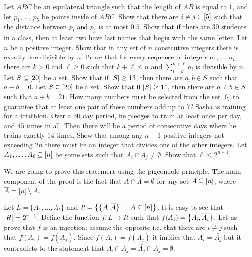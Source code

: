 \begin{chapterendexercises}
  \exercise Let $ABC$ be an equilateral triangle such that the length of $AB$ is
    equal to $1$, and let $p_1$, \dots, $p_5$ be points inside of $ABC$.
    Show that there are $i \neq j \in {[{5}]}$ such that the distance between 
    $p_i$ and $p_j$ is at most $0.5$.
  \exercise Show that if there are 30 students in a class, then at least
    two have last names that begin with the same letter.
  \exercise Let $n$ be a positive integer. Show that in any set of $n$
    consecutive integers there is exactly one divisible by $n$.
  \exercise[recommended] Prove that for every sequence of integers $a_1$, \dots,
    $a_n$ there are $k > 0$ and $\ell \ge 0$ such that $k + \ell \le n$ and
    $\sum_{i = k}^{k + \ell} a_i$ is divisible by $n$.
  \exercise[recommended] Let $S \subseteq {[{20}]}$ be a set. Show that if
    $\left|{S}\right| \ge 13$, then there are $a, b \in S$ such that $a - b = 6$.
  \exercise Let $S \subseteq {[{20}]}$ be a set. Show that if $\left|{S}\right|
    \ge 11$, then there are $a \neq b \in S$ such that $a + b = 21$.
  \exercise How many numbers must be selected from the set ${[{6}]}$ to
    guarantee that at least one pair of these numbers add up to $7$?
  \exercise Sasha is training for a triathlon. Over a $30$ day period, he
    pledges to train at least once per day, and $45$ times in all. Then there
    will be a period of consecutive days where he trains exactly $14$ times.
  \exercise Show that among any $n + 1$ positive integers not exceeding $2n$
    there must be an integer that divides one of the other integers.
  \exercise Let $A_1, \dots, A_\ell \subseteq {[{n}]}$ be some sets such that
    $A_i \cap A_j \neq \emptyset$. Show that $\ell \le 2^{n - 1}$.
    \begin{solution}
      We are going to prove this statement using the pigeonhole principle. The
      main component of the proof is the fact that $A \cap \bar{A} = \emptyset$
      for any set $A \subseteq {[{n}]}$, where $\overline{A} = {[{n}]} \setminus A$.

      Let $L = \{A_1, \dots, A_\ell\}$ and
      $R = \set[A \subseteq \range{n}]{\set{A, \bar{A}}}$. It is easy to see
      that $\left|{R}\right| = 2^{n - 1}$. Define the function $f : L \to R$ such that 
      $f(A_i) = \set{A_i, \bar{A_i}}$. Let us prove that $f$ is an injection; 
      assume the opposite i.e. that there are $i \neq j$ such that 
      $f(A_i) = f(A_j)$. Since $f(A_i) = f(A_j)$ it implies that $A_i =
      \bar{A_j}$ but it contradicts to the statement that $A_i \cap A_j =
      \bar{A_j} \cap A_j = \emptyset$.


\end{solution}
\end{chapterendexercises}
